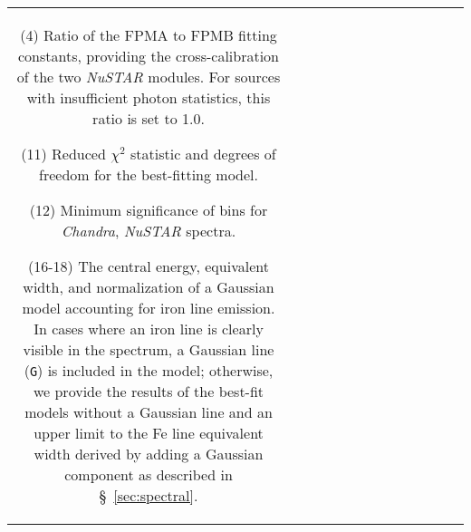 \documentclass[iop,revtex4]{emulateapj}
\begin{document}
\begin{landscape}
\begin{longtable}{cp{0.6in}ccccccccccp{1.7in}}
{(4) Ratio of the FPMA to FPMB fitting constants, providing the cross-calibration of the two \textit{NuSTAR} modules.  For sources with insufficient photon statistics, this ratio is set to 1.0.

(11) Reduced $\chi^2$ statistic and degrees of freedom for the best-fitting model.

(12) Minimum significance of bins for \textit{Chandra}, \textit{NuSTAR} spectra.

(16-18)  The central energy, equivalent width, and normalization of a Gaussian model accounting for iron line emission.  In cases where an iron line is clearly visible in the spectrum, a Gaussian line (\texttt{G}) is included in the model; otherwise, we provide the results of the best-fit models without a Gaussian line and an upper limit to the Fe line equivalent width derived by adding a Gaussian component as described in \S~\ref{sec:spectral}.
}
\label{tab:spectra}
\end{longtable}
\newpage
\end{landscape}
\newpage
\end{document}

